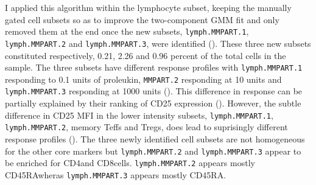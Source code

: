 I applied this algorithm within the lymphocyte subset, keeping the manually gated cell subsets so as to improve the two-component GMM fit and only removed them at the end once the new subsets,
\texttt{lymph.MMPART.1}, \texttt{lymph.MMPART.2} and \texttt{lymph.MMPART.3}, were identified ().
These three new subsets constituted respectively, 0.21, 2.26 and 0.96 percent of the total cells in the sample.
The three subsets have different response profiles with \texttt{lymph.MMPART.1} responding to 0.1 units of proleukin, \texttt{MMPART.2} responding at 10 units and \texttt{lymph.MMPART.3} responding at 1000 units ().
This difference in response can be partially explained by their ranking of CD25 expression ().
However, the subtle difference in CD25 MFI in the lower intensity subsets, \texttt{lymph.MMPART.1}, \texttt{lymph.MMPART.2}, memory Teffs and Tregs, does lead to suprisingly different response profiles ().
The three newly identified cell subsets are not homogeneous for the other core markers but \texttt{lymph.MMPART.2} and \texttt{lymph.MMPART.3} appear to be enriched for CD4\negative and CD8\positive cells.
\texttt{lymph.MMPART.2} appears mostly CD45RA\negative wheras \texttt{lymph.MMPART.3} appears mostly CD45RA\positive.

